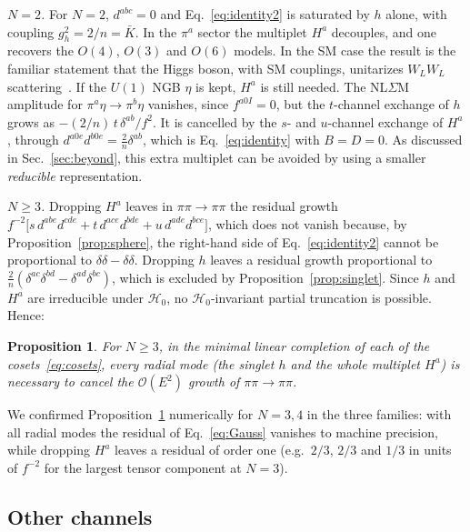 \documentclass[aps,prd,twocolumn,superscriptaddress,nofootinbib,floatfix]{revtex4-2}
\newtheorem{proposition}{Proposition}
\theoremstyle{remark}
\newcommand{\Hg}{\mathcal{H}_0}    %
\begin{document}
\emph{$N=2$.} For $N=2$, $d^{abc}=0$ and Eq.~\eqref{eq:identity2} is saturated by $h$ alone, with coupling $g_h^2=2/n=\bar K$. In the $\pi^a$ sector the multiplet $H^a$ decouples, and one recovers the $O(4)$, $O(3)$ and $O(6)$ models. In the SM case the result is the familiar statement that the Higgs boson, with SM couplings, unitarizes $W_LW_L$ scattering~\cite{Lee:1977eg}. If the $U(1)$ NGB $\eta$ is kept, $H^a$ is still needed. The NL$\Sigma$M amplitude for $\pi^a\eta\to\pi^b\eta$ vanishes, since $f^{a0I}=0$, but the $t$-channel exchange of $h$ grows as $-(2/n)\,t\,\delta^{ab}/f^2$. It is cancelled by the $s$- and $u$-channel exchange of $H^a$, through $d^{a0e}d^{b0e}=\frac{2}{n}\delta^{ab}$, which is Eq.~\eqref{eq:identity} with $B=D=0$. As discussed in Sec.~\ref{sec:beyond}, this extra multiplet can be avoided by using a smaller \emph{reducible} representation.

\emph{$N\geq3$.} Dropping $H^a$ leaves in $\pi\pi\to\pi\pi$ the residual growth $f^{-2}\big[s\,d^{abe}d^{cde}+t\,d^{ace}d^{bde}+u\,d^{ade}d^{bce}\big]$, which does not vanish because, by Proposition~\ref{prop:sphere}, the right-hand side of Eq.~\eqref{eq:identity2} cannot be proportional to $\delta\delta-\delta\delta$. Dropping $h$ leaves a residual growth proportional to $\frac2n(\delta^{ac}\delta^{bd}-\delta^{ad}\delta^{bc})$, which is excluded by Proposition~\ref{prop:singlet}. Since $h$ and $H^a$ are irreducible under $\Hg$, no $\Hg$-invariant partial truncation is possible. Hence:

\begin{proposition}
\label{prop:minimal}
For $N\geq3$, in the minimal linear completion of each of the cosets~\eqref{eq:cosets}, every radial mode (the singlet $h$ and the whole multiplet $H^a$) is necessary to cancel the $\mathcal{O}(E^2)$ growth of $\pi\pi\to\pi\pi$.
\end{proposition}

We confirmed Proposition~\ref{prop:minimal} numerically for $N=3,4$ in the three families: with all radial modes the residual of Eq.~\eqref{eq:Gauss} vanishes to machine precision, while dropping $H^a$ leaves a residual of order one (e.g.\ $2/3$, $2/3$ and $1/3$ in units of $f^{-2}$ for the largest tensor component at $N=3$).

\subsection{Other channels}
\end{document}
